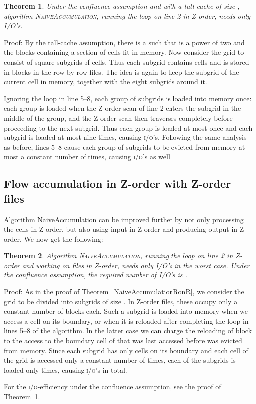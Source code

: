 \documentclass[10pt,a4paper]{article}
\newtheorem{theorem}{Theorem}
\newenvironment{proof}{Proof:}{\qed}
\def\squareforqed{\hbox{\rlap{}}}
\def\qed{\ifmmode\squareforqed\else{\unskip\nobreak\hfil
\penalty50\hskip1em\null\nobreak\hfil\squareforqed
\parfillskip=0pt\finalhyphendemerits=0\endgraf}\fi}
\def\io{\textsc{i/o}\xspace}
\def\ios{\textsc{i/o}'s\xspace}
\begin{document}
\begin{theorem}\label{NaiveAccumulationZonRrealistic}
Under the confluence assumption and with a tall cache of size , algorithm \textsc{NaiveAccumulation}, running the loop on line 2 in Z-order, needs only  I/O's.
\end{theorem}
\begin{proof}
By the tall-cache assumption, there is a  such that  is a power of two and the blocks containing a section of  cells fit in memory. Now consider the grid to consist of square subgrids of  cells. Thus each subgrid contains  cells and is stored in  blocks in the row-by-row files. The idea is again to keep the subgrid of the current cell in memory, together with the eight subgrids around it.

Ignoring the loop in line 5--8, each group of  subgrids is loaded into memory once: each group is loaded when the Z-order scan of line 2 enters the subgrid  in the middle of the group, and the Z-order scan then traverses  completely before proceeding to the next subgrid. Thus each group is loaded at most once and each subgrid is loaded at most nine times, causing  \ios. Following the same analysis as before, lines 5--8 cause each group of  subgrids to be evicted from memory at most a constant number of times, causing  \ios as well.
\end{proof}

\subsection{Flow accumulation in Z-order with Z-order files}

Algorithm NaiveAccumulation can be improved further by not only processing the cells in Z-order, but also using input in Z-order and producing output in Z-order. We now get the following:

\begin{theorem}
Algorithm \textsc{NaiveAccumulation}, running the loop on line 2 in Z-order and working on files in Z-order, needs only  I/O's in the worst case. Under the confluence assumption, the required number of I/O's is .
\end{theorem}
\begin{proof}
As in the proof of Theorem~\ref{NaiveAccumulationRonR}, we consider the grid to be divided into subgrids of size . In Z-order files, these occupy only a constant number of blocks each. Such a subgrid  is loaded into memory when we access a cell on its boundary, or when it is reloaded after completing the loop in lines 5--8 of the algorithm. In the latter case we can charge the reloading of block  to the access to the boundary cell of  that was last accessed before  was evicted from memory. Since each subgrid has only  cells on its boundary and each cell of the grid is accessed only a constant number of times, each of the  subgrids is loaded only  times, causing  \ios in total.

For the \io-efficiency under the confluence assumption, see the proof of Theorem~\ref{NaiveAccumulationZonRrealistic}.
\end{proof}
\end{document}
